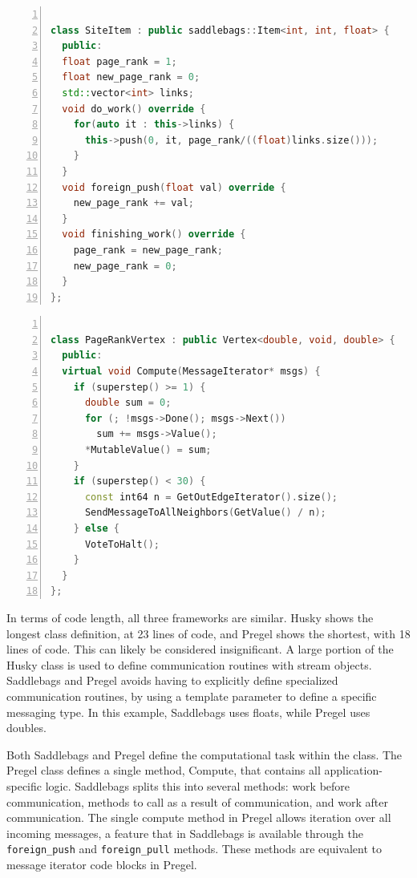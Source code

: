 \documentclass{uit-report}
\begin{document}
\begin{lstlisting}[label={lst:pageranksaddle}, float=h!,frame=tlrb,numbers=left, caption={PageRank item class in Saddlebags}, captionpos=t, language=c++, showstringspaces=false]

class SiteItem : public saddlebags::Item<int, int, float> {
  public:
  float page_rank = 1;
  float new_page_rank = 0;
  std::vector<int> links;
  void do_work() override {
    for(auto it : this->links) {
      this->push(0, it, page_rank/((float)links.size()));
    }
  }
  void foreign_push(float val) override {
    new_page_rank += val;
  }
  void finishing_work() override {
    page_rank = new_page_rank;
    new_page_rank = 0;
  }
};
\end{lstlisting}

\begin{lstlisting}[label={lst:pagerankpregel}, float=h!,frame=tlrb, numbers=left,caption={PageRank vertex class in Pregel}, captionpos=t, language=c++, showstringspaces=false]

class PageRankVertex : public Vertex<double, void, double> {
  public:
  virtual void Compute(MessageIterator* msgs) {
    if (superstep() >= 1) {
      double sum = 0;
      for (; !msgs->Done(); msgs->Next())
        sum += msgs->Value();
      *MutableValue() = sum;
    }
    if (superstep() < 30) {
      const int64 n = GetOutEdgeIterator().size();
      SendMessageToAllNeighbors(GetValue() / n);
    } else {
      VoteToHalt();
    }
  }
};

\end{lstlisting}
\newpage
In terms of code length, all three frameworks are similar. Husky shows the longest class definition, at 23 lines of code, and Pregel shows the shortest, with 18 lines of code. This can likely be considered insignificant. A large portion of the Husky class is used to define communication routines with stream objects. Saddlebags and Pregel avoids having to explicitly define specialized communication routines, by using a template parameter to define a specific messaging type. In this example, Saddlebags uses floats, while Pregel uses doubles.

Both Saddlebags and Pregel define the computational task within the class. The Pregel class defines a single method, Compute, that contains all application-specific logic. Saddlebags splits this into several methods: work before communication, methods to call as a result of communication, and work after communication. The single compute method in Pregel allows iteration over all incoming messages, a feature that in Saddlebags is available through the \texttt{foreign\_push} and \texttt{foreign\_pull} methods. These methods are equivalent to message iterator code blocks in Pregel.
\end{document}
